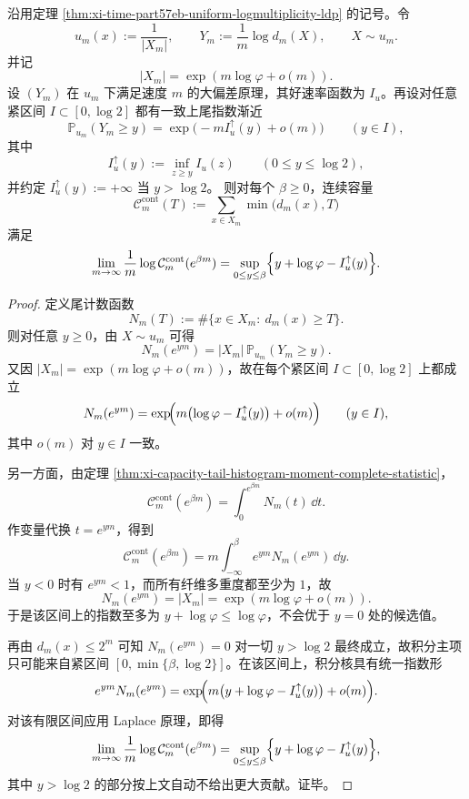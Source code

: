 \begin{theorem}\label{thm:xi-time-part9t-capacity-laplace-ldp-tail-variational}
沿用定理 \ref{thm:xi-time-part57eb-uniform-logmultiplicity-ldp} 的记号。令
\[
u_m(x):=\frac{1}{|X_m|},
\qquad
Y_m:=\frac1m\log d_m(X),
\qquad
X\sim u_m.
\]
并记
\[
|X_m|=\exp(m\log\varphi+o(m)).
\]
设 \((Y_m)\) 在 \(u_m\) 下满足速度 \(m\) 的大偏差原理，其好速率函数为 \(I_u\)。再设对任意紧区间 \(I\subset[0,\log 2]\) 都有一致上尾指数渐近
\[
\mathbb P_{u_m}(Y_m\ge y)
=
\exp\!\bigl(-mI_u^\uparrow(y)+o(m)\bigr)
\qquad (y\in I),
\]
其中
\[
I_u^\uparrow(y):=\inf_{z\ge y}I_u(z)
\qquad (0\le y\le \log 2),
\]
并约定 \(I_u^\uparrow(y):=+\infty\) 当 \(y>\log 2\)。
则对每个 \(\beta\ge 0\)，连续容量
\[
\mathcal C_m^{\mathrm{cont}}(T):=\sum_{x\in X_m}\min\bigl(d_m(x),T\bigr)
\]
满足
\[
\lim_{m\to\infty}\frac1m\log \mathcal C_m^{\mathrm{cont}}(e^{\beta m})
=
\sup_{0\le y\le \beta}
\Bigl\{
y+\log\varphi-I_u^\uparrow(y)
\Bigr\}.
\]
\end{theorem}
\begin{proof}
定义尾计数函数
\[
N_m(T):=\#\{x\in X_m:\ d_m(x)\ge T\}.
\]
则对任意 \(y\ge 0\)，由 \(X\sim u_m\) 可得
\[
N_m(e^{ym})
=
|X_m|\,\mathbb P_{u_m}(Y_m\ge y).
\]
又因 \(|X_m|=\exp(m\log\varphi+o(m))\)，故在每个紧区间 \(I\subset[0,\log 2]\) 上都成立
\[
N_m(e^{ym})
=
\exp\!\Bigl(
m\bigl(\log\varphi-I_u^\uparrow(y)\bigr)+o(m)
\Bigr)
\qquad (y\in I),
\]
其中 \(o(m)\) 对 \(y\in I\) 一致。

另一方面，由定理 \ref{thm:xi-capacity-tail-histogram-moment-complete-statistic}，
\[
\mathcal C_m^{\mathrm{cont}}(e^{\beta m})
=
\int_0^{e^{\beta m}}N_m(t)\,\dd t.
\]
作变量代换 \(t=e^{ym}\)，得到
\[
\mathcal C_m^{\mathrm{cont}}(e^{\beta m})
=
m\int_{-\infty}^{\beta}e^{ym}N_m(e^{ym})\,\dd y.
\]
当 \(y<0\) 时有 \(e^{ym}<1\)，而所有纤维多重度都至少为 \(1\)，故
\[
N_m(e^{ym})=|X_m|=\exp(m\log\varphi+o(m)).
\]
于是该区间上的指数至多为 \(y+\log\varphi\le \log\varphi\)，不会优于 \(y=0\) 处的候选值。

再由 \(d_m(x)\le 2^m\) 可知 \(N_m(e^{ym})=0\) 对一切 \(y>\log 2\) 最终成立，故积分主项只可能来自紧区间 \([0,\min\{\beta,\log 2\}]\)。在该区间上，积分核具有统一指数形
\[
e^{ym}N_m(e^{ym})
=
\exp\!\Bigl(
m\bigl(y+\log\varphi-I_u^\uparrow(y)\bigr)+o(m)
\Bigr).
\]
对该有限区间应用 Laplace 原理，即得
\[
\lim_{m\to\infty}\frac1m\log \mathcal C_m^{\mathrm{cont}}(e^{\beta m})
=
\sup_{0\le y\le \beta}
\Bigl\{
y+\log\varphi-I_u^\uparrow(y)
\Bigr\},
\]
其中 \(y>\log 2\) 的部分按上文自动不给出更大贡献。证毕。
\end{proof}

